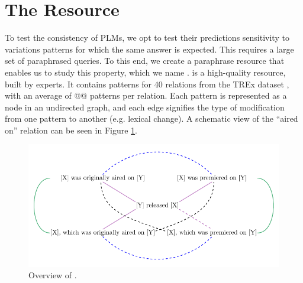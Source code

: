 \section{The \resource{} Resource}
\label{sec:rel-graph}


To test the consistency of PLMs, we opt to test their predictions sensitivity to variations patterns for which the same answer is expected. This requires a large set of paraphrased queries. To this end, we create a paraphrase resource that enables us to study this property, which we name \resource{}. \resource{} is a high-quality resource, built by experts. %
It contains patterns for 40 relations from the TREx dataset \cite{trex}, with an average of @@ patterns per relation.
Each pattern is represented as a node in an undirected graph, and each edge signifies the type of modification from one pattern to another (e.g. lexical change).
A schematic view of the ``aired on'' relation can be seen in Figure \ref{fig:graph}. 




\begin{figure}[t!]
\centering

\includegraphics[width=1.\columnwidth]{figures/ent_graph}

\caption{Overview of \resource{}.}
\label{fig:graph}
\end{figure}

